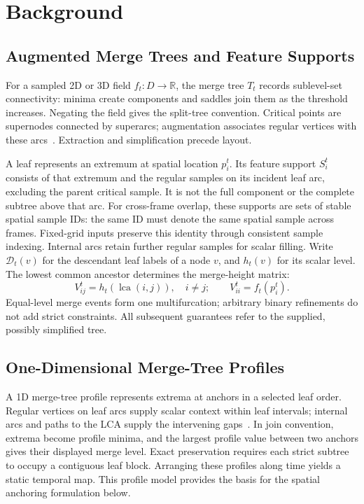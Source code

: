 \documentclass{vgtc}                %
\newcommand{\lca}{\operatorname{lca}}
\begin{document}
\section{Background}\label{sec:background}
\subsection{Augmented Merge Trees and Feature Supports}
For a sampled 2D or 3D field $f_t:D\to\mathbb{R}$, the merge tree $T_t$ records sublevel-set connectivity: minima create components and saddles join them as the threshold increases. Negating the field gives the split-tree convention. Critical points are supernodes connected by superarcs; augmentation associates regular vertices with these arcs~\cite{Koepp:2023:TMTM,STMTM:2026,Tierny:2018:TTK}. Extraction and simplification precede layout.

A leaf represents an extremum at spatial location $p_i^t$. Its feature support $S_i^t$ consists of that extremum and the regular samples on its incident leaf arc, excluding the parent critical sample. It is not the full component or the complete subtree above that arc. For cross-frame overlap, these supports are sets of stable spatial sample IDs: the same ID must denote the same spatial sample across frames. Fixed-grid inputs preserve this identity through consistent sample indexing. Internal arcs retain further regular samples for scalar filling. Write $\mathcal{D}_t(v)$ for the descendant leaf labels of a node $v$, and $h_t(v)$ for its scalar level. The lowest common ancestor determines the merge-height matrix:
\begin{equation}\label{eq:merge}
 V_{ij}^t=h_t(\lca(i,j)),\quad i\ne j;\qquad
 V_{ii}^t=f_t(p_i^t).
\end{equation}
Equal-level merge events form one multifurcation; arbitrary binary refinements do not add strict constraints. All subsequent guarantees refer to the supplied, possibly simplified tree.

\subsection{One-Dimensional Merge-Tree Profiles}
A 1D merge-tree profile represents extrema at anchors in a selected leaf order. Regular vertices on leaf arcs supply scalar context within leaf intervals; internal arcs and paths to the LCA supply the intervening gaps~\cite{Koepp:2023:TMTM,STMTM:2026}. In join convention, extrema become profile minima, and the largest profile value between two anchors gives their displayed merge level. Exact preservation requires each strict subtree to occupy a contiguous leaf block. Arranging these profiles along time yields a static temporal map. This profile model provides the basis for the spatial anchoring formulation below.
\end{document}
